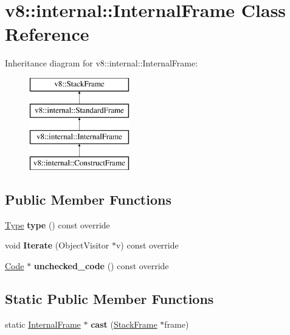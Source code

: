 \hypertarget{classv8_1_1internal_1_1_internal_frame}{}\section{v8\+:\+:internal\+:\+:Internal\+Frame Class Reference}
\label{classv8_1_1internal_1_1_internal_frame}
Inheritance diagram for v8\+:\+:internal\+:\+:Internal\+Frame\+:\begin{figure}[H]
\begin{center}
\leavevmode
\includegraphics[height=4.000000cm]{classv8_1_1internal_1_1_internal_frame}
\end{center}
\end{figure}
\subsection*{Public Member Functions}
\begin{DoxyCompactItemize}
\item 
\hyperlink{classv8_1_1internal_1_1_type}{Type} {\bfseries type} () const  override\hypertarget{classv8_1_1internal_1_1_internal_frame_a73f4c4df788555a22daf09c57d673873}{}\label{classv8_1_1internal_1_1_internal_frame_a73f4c4df788555a22daf09c57d673873}

\item 
void {\bfseries Iterate} (Object\+Visitor $\ast$v) const  override\hypertarget{classv8_1_1internal_1_1_internal_frame_a39814512eefadb438d968407d7ac54ff}{}\label{classv8_1_1internal_1_1_internal_frame_a39814512eefadb438d968407d7ac54ff}

\item 
\hyperlink{classv8_1_1internal_1_1_code}{Code} $\ast$ {\bfseries unchecked\+\_\+code} () const  override\hypertarget{classv8_1_1internal_1_1_internal_frame_a79d4fddf31deede5e098688c05b341b9}{}\label{classv8_1_1internal_1_1_internal_frame_a79d4fddf31deede5e098688c05b341b9}

\end{DoxyCompactItemize}
\subsection*{Static Public Member Functions}
\begin{DoxyCompactItemize}
\item 
static \hyperlink{classv8_1_1internal_1_1_internal_frame}{Internal\+Frame} $\ast$ {\bfseries cast} (\hyperlink{classv8_1_1_stack_frame}{Stack\+Frame} $\ast$frame)\hypertarget{classv8_1_1internal_1_1_internal_frame_a2e3c28f5bfdf3f5387a5f774d0398271}{}\label{classv8_1_1internal_1_1_internal_frame_a2e3c28f5bfdf3f5387a5f774d0398271}

\end{DoxyCompactItemize}
